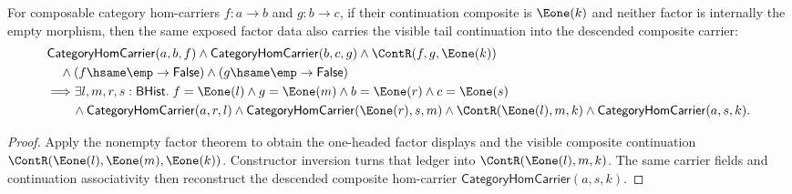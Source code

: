 \begin{theorem}
\label{thm:category-comp-nonempty-e1-morphism-tail-result-descent}
For composable category hom-carriers $f:a\to b$ and $g:b\to c$, if their
continuation composite is $\Eone(k)$ and neither factor is internally the
empty morphism, then the same exposed factor data also carries the visible
tail continuation into the descended composite carrier:
$$
\begin{aligned}
&\mathsf{CategoryHomCarrier}(a,b,f)\land
\mathsf{CategoryHomCarrier}(b,c,g)\land
\ContR(f,g,\Eone(k))\\
&\quad\land (f\hsame\emp\to\mathsf{False})\land
(g\hsame\emp\to\mathsf{False})\\
&\Longrightarrow
\exists l,m,r,s:\mathsf{BHist}.\;
f=\Eone(l)\land g=\Eone(m)\land b=\Eone(r)\land c=\Eone(s)\\
&\qquad\land\mathsf{CategoryHomCarrier}(a,r,l)\land
\mathsf{CategoryHomCarrier}(\Eone(r),s,m)\land
\ContR(\Eone(l),m,k)\land
\mathsf{CategoryHomCarrier}(a,s,k).
\end{aligned}
$$
\end{theorem}
\begin{proof}
Apply the nonempty factor theorem to obtain the one-headed factor displays
and the visible composite continuation
$\ContR(\Eone(l),\Eone(m),\Eone(k))$. Constructor inversion turns that ledger
into $\ContR(\Eone(l),m,k)$. The same carrier fields and continuation
associativity then reconstruct the descended composite hom-carrier
$\mathsf{CategoryHomCarrier}(a,s,k)$.
\end{proof}


